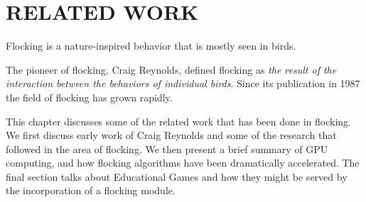 \chapter{RELATED WORK}\label{chap2}


Flocking is a nature-inspired behavior that is mostly seen in birds. 

The pioneer of flocking, Craig Reynolds, defined flocking as \textit{the result of the interaction between the behaviors of individual birds}\cite{craig1}. Since its publication in 1987 the field of flocking has grown rapidly. %

This chapter discusses some of the related work that has been done in flocking. We first discuss early work of Craig Reynolds and some of the research that followed in the area of flocking. We then present a brief summary of GPU computing, and how flocking algorithms have been dramatically accelerated. The final section talks about Educational Games and how they might be served by the incorporation of a flocking module. 






